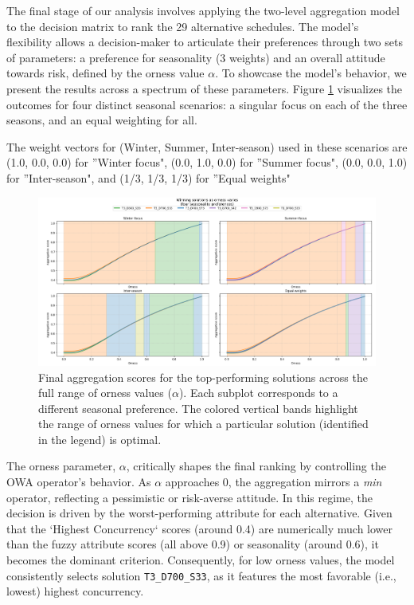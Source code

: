 \label{sec:results}

The final stage of our analysis involves applying the two-level aggregation model to the decision matrix to rank the 29 alternative schedules. The model's flexibility allows a decision-maker to articulate their preferences through two sets of parameters: a preference for seasonality (3 weights) and an overall attitude towards risk, defined by the orness value $\alpha$. To showcase the model's behavior, we present the results across a spectrum of these parameters. Figure \ref{fig:results_plot} visualizes the outcomes for four distinct seasonal scenarios: a singular focus on each of the three seasons, and an equal weighting for all. 

The weight vectors for (Winter, Summer, Inter-season) used in these scenarios are (1.0, 0.0, 0.0) for ''Winter focus", (0.0, 1.0, 0.0) for ''Summer focus", (0.0, 0.0, 1.0) for ''Inter-season", and (1/3, 1/3, 1/3) for ''Equal weights"

\begin{figure}[h!]
    \centering
    \begin{adjustwidth}{-1.2cm}{-1.8cm}
    \includegraphics[width=1.08\textwidth]{ch3/figures/ResultsOrness.png}
    \end{adjustwidth}
    \caption{Final aggregation scores for the top-performing solutions across the full range of orness values ($\alpha$). Each subplot corresponds to a different seasonal preference. The colored vertical bands highlight the range of orness values for which a particular solution (identified in the legend) is optimal.}
    \label{fig:results_plot}
\end{figure}

The orness parameter, $\alpha$, critically shapes the final ranking by controlling the OWA operator's behavior. As $\alpha$ approaches 0, the aggregation mirrors a \textit{min} operator, reflecting a pessimistic or risk-averse attitude. In this regime, the decision is driven by the worst-performing attribute for each alternative. Given that the `Highest Concurrency` scores (around 0.4) are numerically much lower than the fuzzy attribute scores (all above 0.9) or seasonality (around 0.6), it becomes the dominant criterion. Consequently, for low orness values, the model consistently selects solution \texttt{T3\_D700\_S33}, as it features the most favorable (i.e., lowest) highest concurrency.\\

